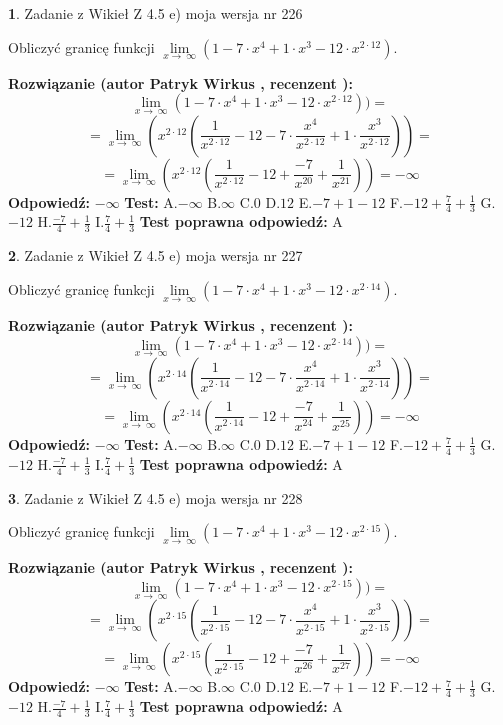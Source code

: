 \documentclass[12pt, a4paper]{article}
\theoremstyle{definition} %
\newtheorem{zad}{}
\newcommand{\zadStart}[1]{\begin{zad}#1\newline}
\newcommand{\zadStop}{\end{zad}}
\newcommand{\rozwStart}[2]{\noindent \textbf{Rozwiązanie (autor #1 , recenzent #2): }\newline}
\newcommand{\rozwStop}{\newline}
\newcommand{\odpStart}{\noindent \textbf{Odpowiedź:}\newline}
\newcommand{\odpStop}{\newline}
\newcommand{\testStart}{\noindent \textbf{Test:}\newline}
\newcommand{\testStop}{\newline}
\newcommand{\kluczStart}{\noindent \textbf{Test poprawna odpowiedź:}\newline}
\newcommand{\kluczStop}{\newline}
\begin{document}
\zadStart{Zadanie z Wikieł Z 4.5 e) moja wersja nr 226}



Obliczyć granicę funkcji  $\lim\limits_{x\to\ \infty}(1 - 7 \cdot x^{4}+1 \cdot x^{3}- 12 \cdot x^{2\cdot12})$.
\zadStop
\rozwStart{Patryk Wirkus}{}
$$\lim\limits_{x\to\ \infty}(1 - 7 \cdot x^{4}+1 \cdot x^{3}- 12 \cdot x^{2\cdot12}))=$$
$$=\lim\limits_{x\to\ \infty}(x^{2\cdot12}(\frac{1}{x^{2\cdot12}}-12 -7 \cdot \frac{x^{4}}{x^{2\cdot12}}+1 \cdot \frac{x^{3}}{x^{2\cdot12}}))=$$
$$=\lim\limits_{x\to\ \infty}(x^{2\cdot12}(\frac{1}{x^{2\cdot12}}-12 + \frac{-7}{x^{20}}+ \frac{1}{x^{21}}))=-\infty$$
\rozwStop
\odpStart
$-\infty$
\odpStop
\testStart
A.$-\infty$ B.$\infty$ C.$0$ D.$12$ E.$-7 + 1 - 12$
F.$-12+\frac{7}{4}+\frac{1}{3}$ G.$-12$
H.$\frac{-7}{4}+\frac{1}{3}$
I.$\frac{7}{4}+\frac{1}{3}$
\testStop
\kluczStart
A
\kluczStop



\zadStart{Zadanie z Wikieł Z 4.5 e) moja wersja nr 227}



Obliczyć granicę funkcji  $\lim\limits_{x\to\ \infty}(1 - 7 \cdot x^{4}+1 \cdot x^{3}- 12 \cdot x^{2\cdot14})$.
\zadStop
\rozwStart{Patryk Wirkus}{}
$$\lim\limits_{x\to\ \infty}(1 - 7 \cdot x^{4}+1 \cdot x^{3}- 12 \cdot x^{2\cdot14}))=$$
$$=\lim\limits_{x\to\ \infty}(x^{2\cdot14}(\frac{1}{x^{2\cdot14}}-12 -7 \cdot \frac{x^{4}}{x^{2\cdot14}}+1 \cdot \frac{x^{3}}{x^{2\cdot14}}))=$$
$$=\lim\limits_{x\to\ \infty}(x^{2\cdot14}(\frac{1}{x^{2\cdot14}}-12 + \frac{-7}{x^{24}}+ \frac{1}{x^{25}}))=-\infty$$
\rozwStop
\odpStart
$-\infty$
\odpStop
\testStart
A.$-\infty$ B.$\infty$ C.$0$ D.$12$ E.$-7 + 1 - 12$
F.$-12+\frac{7}{4}+\frac{1}{3}$ G.$-12$
H.$\frac{-7}{4}+\frac{1}{3}$
I.$\frac{7}{4}+\frac{1}{3}$
\testStop
\kluczStart
A
\kluczStop



\zadStart{Zadanie z Wikieł Z 4.5 e) moja wersja nr 228}



Obliczyć granicę funkcji  $\lim\limits_{x\to\ \infty}(1 - 7 \cdot x^{4}+1 \cdot x^{3}- 12 \cdot x^{2\cdot15})$.
\zadStop
\rozwStart{Patryk Wirkus}{}
$$\lim\limits_{x\to\ \infty}(1 - 7 \cdot x^{4}+1 \cdot x^{3}- 12 \cdot x^{2\cdot15}))=$$
$$=\lim\limits_{x\to\ \infty}(x^{2\cdot15}(\frac{1}{x^{2\cdot15}}-12 -7 \cdot \frac{x^{4}}{x^{2\cdot15}}+1 \cdot \frac{x^{3}}{x^{2\cdot15}}))=$$
$$=\lim\limits_{x\to\ \infty}(x^{2\cdot15}(\frac{1}{x^{2\cdot15}}-12 + \frac{-7}{x^{26}}+ \frac{1}{x^{27}}))=-\infty$$
\rozwStop
\odpStart
$-\infty$
\odpStop
\testStart
A.$-\infty$ B.$\infty$ C.$0$ D.$12$ E.$-7 + 1 - 12$
F.$-12+\frac{7}{4}+\frac{1}{3}$ G.$-12$
H.$\frac{-7}{4}+\frac{1}{3}$
I.$\frac{7}{4}+\frac{1}{3}$
\testStop
\kluczStart
A
\kluczStop
\end{document}

